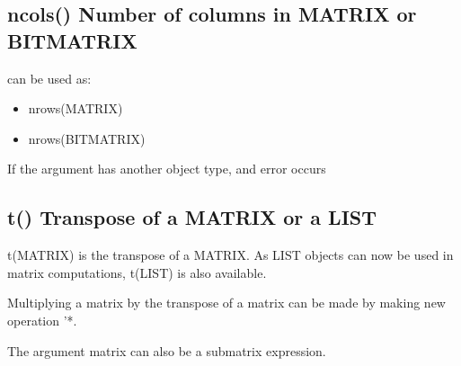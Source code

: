 \subsection{\textcolor{VioletRed}{ncols}() Number of columns in MATRIX or BITMATRIX}
\label{ncols}
can be used as:
\begin{itemize}
\item  \textcolor{VioletRed}{nrows}(MATRIX)
\item  \textcolor{VioletRed}{nrows}(BITMATRIX)
\end{itemize}
\begin{note}
If the argument has another object type, and error occurs
\end{note}
\subsection{\textcolor{VioletRed}{t}() Transpose of a MATRIX or a LIST}
\label{t}
\textcolor{VioletRed}{t}(MATRIX) is the transpose of a MATRIX. As LIST objects can now
be used in matrix computations, \textcolor{VioletRed}{t}(LIST) is also available.
\begin{note}
Multiplying a matrix by the transpose of a matrix can be made by
making new operation '*.
\end{note}
\begin{note}
The argument matrix can also be a submatrix expression.
\end{note}
